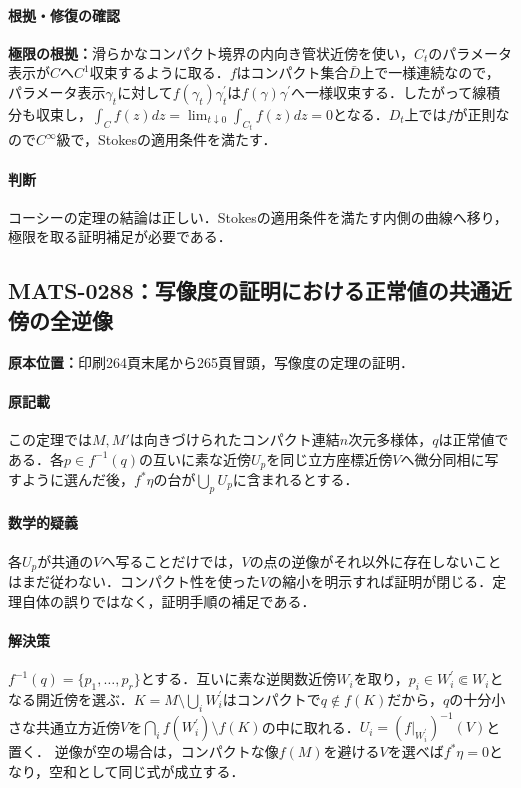 \documentclass[a4paper,10pt]{ltjsarticle}
\begin{document}
\paragraph{根拠・修復の確認}\textbf{極限の根拠：}滑らかなコンパクト境界の内向き管状近傍を使い，$C_t$のパラメータ表示が$C$へ$C^1$収束するように取る．$f$はコンパクト集合$\bar D$上で一様連続なので，パラメータ表示$\gamma_t$に対して$f(\gamma_t)\gamma_t^{\prime}$は$f(\gamma)\gamma^{\prime}$へ一様収束する．したがって線積分も収束し，$\int_Cf(z)dz=\lim_{t\downarrow0}\int_{C_t}f(z)dz=0$となる．$D_t$上では$f$が正則なので$C^\infty$級で，Stokesの適用条件を満たす．

\paragraph{判断}コーシーの定理の結論は正しい．Stokesの適用条件を満たす内側の曲線へ移り，極限を取る証明補足が必要である．


\subsection*{MATS-0288：写像度の証明における正常値の共通近傍の全逆像}\label{math:MATS-0288}
\noindent\textbf{原本位置：}印刷264頁末尾から265頁冒頭，写像度の定理の証明．

\paragraph{原記載}この定理では$M,M\prime$は向きづけられたコンパクト連結$n$次元多様体，$q$は正常値である．各$p\in f^{-1}(q)$の互いに素な近傍$U_p$を同じ立方座標近傍$V$へ微分同相に写すように選んだ後，$f^*\eta$の台が$\bigcup_pU_p$に含まれるとする．

\paragraph{数学的疑義}各$U_p$が共通の$V$へ写ることだけでは，$V$の点の逆像がそれ以外に存在しないことはまだ従わない．コンパクト性を使った$V$の縮小を明示すれば証明が閉じる．定理自体の誤りではなく，証明手順の補足である．

\paragraph{解決策}$f^{-1}(q)=\{p_1,\ldots,p_r\}$とする．互いに素な逆関数近傍$W_i$を取り，$p_i\in W_i^{\prime}\Subset W_i$となる開近傍を選ぶ．$K=M\setminus\bigcup_iW_i^{\prime}$はコンパクトで$q\notin f(K)$だから，$q$の十分小さな共通立方近傍$V$を$\bigcap_i f(W_i^{\prime})\setminus f(K)$の中に取れる．$U_i=(f|_{W_i^{\prime}})^{-1}(V)$と置く． 逆像が空の場合は，コンパクトな像$f(M)$を避ける$V$を選べば$f^*\eta=0$となり，空和として同じ式が成立する．
\end{document}
